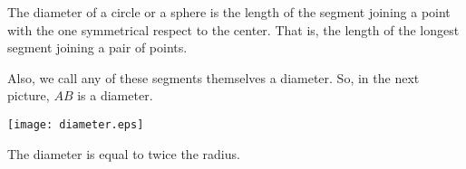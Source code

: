 \documentclass{article}
\begin{document}
The diameter of a circle or a sphere is the length of the segment joining a point with the one symmetrical respect to the center. That is, the length of the longest segment joining a pair of points.

Also, we call any of these segments themselves a diameter. So, in the next picture, $AB$ is a diameter.

\begin{center}
\texttt{[image: diameter.eps]}
\end{center}

The diameter is equal to twice the radius.
\end{document}
